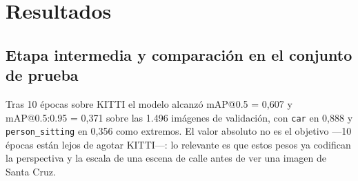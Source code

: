 \documentclass[10pt,a4paper]{article}
\begin{document}
\section{Resultados}
\subsection{Etapa intermedia y comparación en el conjunto de prueba}
Tras 10 épocas sobre KITTI el modelo alcanzó mAP@0.5 = 0{,}607 y mAP@0.5:0.95 = 0{,}371
sobre las 1{.}496 imágenes de validación, con \texttt{car} en 0{,}888 y
\texttt{person\_sitting} en 0{,}356 como extremos. El valor absoluto no es el objetivo
---10 épocas están lejos de agotar KITTI---: lo relevante es que estos pesos ya codifican
la perspectiva y la escala de una escena de calle antes de ver una imagen de Santa Cruz.
\end{document}
